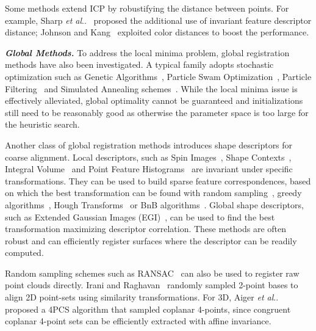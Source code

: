 \documentclass[10pt,journal,cspaper,compsoc]{IEEEtran}
\makeatletter
\DeclareRobustCommand\onedot{\futurelet\@let@token\@onedot}
\def\@onedot{\ifx\@let@token.\else.\null\fi\xspace}
\def\etal{\emph{et al}\onedot}
\makeatother
\begin{document}
Some methods extend ICP by robustifying the distance between points.
For example, Sharp \etal~\cite{sharp2002icp} proposed the additional use of invariant feature descriptor distance; Johnson and Kang~\cite{johnson1999registration} exploited color distances to boost the performance.

\vspace{0.06in}
\noindent\textbf{\emph{{Global Methods.}}}
To address the local minima problem, global registration methods have also been investigated. A typical family adopts stochastic optimization such as Genetic Algorithms~\cite{silva2005precision,robertson2002parallel}, Particle Swam Optimization~\cite{wachowiak2004approach}, Particle Filtering~\cite{sandhu2010point}  and Simulated Annealing schemes~\cite{blais1995registering,papazov2011stochastic}. While the local minima issue is effectively alleviated, global optimality cannot be guaranteed and initializations still need to be reasonably good as otherwise the parameter space is too large for the heuristic search.

Another class of global registration methods introduces shape descriptors for coarse alignment. Local descriptors, such as Spin Images~\cite{johnson1999using}, Shape Contexts~\cite{belongie2002shape}, Integral Volume~\cite{gelfand2005robust} and Point Feature Histograms~\cite{rusu2009fast} are invariant under specific transformations. They can be used to build sparse feature correspondences, based on which the best transformation can be found with random sampling~\cite{rusu2009fast}, greedy algorithms~\cite{johnson1999using}, Hough Transforms~\cite{woodford2014demisting} or BnB algorithms~\cite{gelfand2005robust,bazin2012globally}. Global shape descriptors, such as Extended Gaussian Images (EGI)~\cite{makadia2006fully}, can be used to find the best transformation maximizing descriptor correlation. These methods are often robust and can efficiently register surfaces where the descriptor can be readily computed.

Random sampling schemes such as RANSAC~\cite{fischler1981random} can also be used to register raw point clouds directly. Irani and Raghavan~\cite{irani1999combinatorial} randomly sampled 2-point bases to align 2D point-sets using similarity transformations. For 3D, Aiger \etal~\cite{aiger20084} proposed a 4PCS algorithm that sampled coplanar 4-points, since congruent coplanar 4-point sets can be efficiently extracted with affine invariance.
\end{document}
